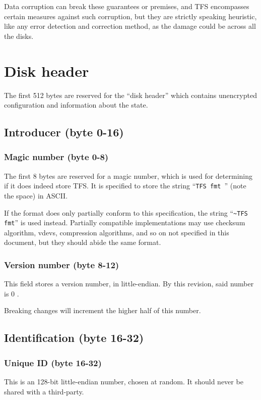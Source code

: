 \documentclass[11pt,a4paper]{report}
\newcommand{\clustersize}{512 }
\newcommand{\versionnumber}{0 }
\begin{document}
        Data corruption can break these guarantees or premises, and TFS
        encompasses certain measures against such corruption, but they are
        strictly speaking heuristic, like any error detection and correction
        method, as the damage could be across all the disks.

    \chapter{Disk header}
    \label{header}
    The first \clustersize bytes are reserved for the ``disk header'' which
    contains unencrypted configuration and information about the state.

    \section{Introducer (byte 0-16)}
        \subsection{Magic number (byte 0-8)}
        The first 8 bytes are reserved for a magic number, which is used for
        determining if it does indeed store TFS\@. It is specified to store the
        string ``\texttt{TFS fmt }'' (note the space) in ASCII.

        If the format does only partially conform to this specification, the
        string ``\texttt{\textasciitilde TFS fmt}'' is used instead. Partially
        compatible implementations may use checksum algorithm, vdevs,
        compression algorithms, and so on not specified in this document, but
        they should abide the same format.

        \subsection{Version number (byte 8-12)}
        \label{header:versionnumber}
        This field stores a version number, in little-endian. By this revision,
        said number is \versionnumber.

        Breaking changes will increment the higher half of this number.

    \section{Identification (byte 16-32)}
        \subsection{Unique ID (byte 16-32)}
        \label{uid}
        This is an 128-bit little-endian number, chosen at random. It should
        never be shared with a third-party.
\end{document}
